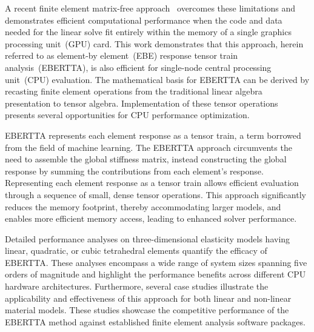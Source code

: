 \documentclass[]             %
{NASA}                       %
\begin{document}
A recent finite element matrix-free approach~\cite{ref:settgast2023performant} 
overcomes these limitations and demonstrates efficient computational performance when the code and data needed for the linear solve fit entirely within the memory of a single graphics processing unit~(GPU) card.
This work demonstrates that this approach, herein referred to as element-by element~(EBE) response tensor train analysis~(EBERTTA), is also efficient for single-node central processing unit~(CPU) evaluation. %
The mathematical basis for EBERTTA can be derived by recasting finite element operations from the traditional linear algebra presentation %
to tensor algebra. %
Implementation of these tensor operations presents several opportunities for CPU performance optimization.

EBERTTA represents each element response as a tensor train, a term borrowed from the field of machine learning.\cite{ref:oseledets-2011-tensor-train} 
The EBERTTA approach circumvents the need to assemble the global stiffness matrix, instead constructing the global response by summing the contributions from each element's response. 
Representing each element response as a tensor train allows efficient evaluation through a sequence of small, dense tensor operations. 
This approach significantly reduces the memory footprint, thereby accommodating larger models, and enables more efficient memory access, leading to enhanced solver performance.

Detailed performance analyses on three-dimensional elasticity models having linear, quadratic, or cubic tetrahedral elements quantify the efficacy of EBERTTA. 
These analyses encompass a wide range of system sizes spanning five orders of magnitude and highlight the performance benefits across different CPU hardware architectures. 
Furthermore, several case studies illustrate the applicability and effectiveness of this approach for both linear and non-linear material models. These studies showcase the competitive performance of the EBERTTA method against established finite element analysis software packages.  
\end{document}

